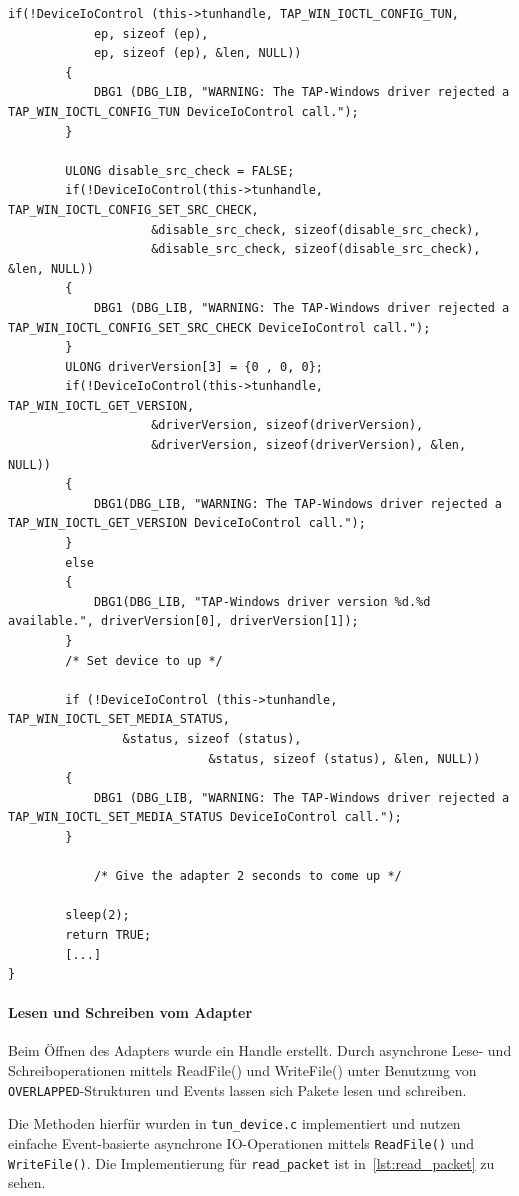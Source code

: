 {\begin{lstlisting}[caption=Konfiguration eines TAP-Geräts,label=lst:tap-device-configuration]
        if(!DeviceIoControl (this->tunhandle, TAP_WIN_IOCTL_CONFIG_TUN,
            ep, sizeof (ep),
            ep, sizeof (ep), &len, NULL))
        {
            DBG1 (DBG_LIB, "WARNING: The TAP-Windows driver rejected a TAP_WIN_IOCTL_CONFIG_TUN DeviceIoControl call.");
        }

        ULONG disable_src_check = FALSE;
        if(!DeviceIoControl(this->tunhandle, TAP_WIN_IOCTL_CONFIG_SET_SRC_CHECK,
                    &disable_src_check, sizeof(disable_src_check),
                    &disable_src_check, sizeof(disable_src_check), &len, NULL))
        {
            DBG1 (DBG_LIB, "WARNING: The TAP-Windows driver rejected a TAP_WIN_IOCTL_CONFIG_SET_SRC_CHECK DeviceIoControl call.");
        }
        ULONG driverVersion[3] = {0 , 0, 0};
        if(!DeviceIoControl(this->tunhandle, TAP_WIN_IOCTL_GET_VERSION,
                    &driverVersion, sizeof(driverVersion),
                    &driverVersion, sizeof(driverVersion), &len, NULL))
        {
            DBG1(DBG_LIB, "WARNING: The TAP-Windows driver rejected a TAP_WIN_IOCTL_GET_VERSION DeviceIoControl call.");
        }
        else
        {
            DBG1(DBG_LIB, "TAP-Windows driver version %d.%d available.", driverVersion[0], driverVersion[1]);
        }
        /* Set device to up */

        if (!DeviceIoControl (this->tunhandle, TAP_WIN_IOCTL_SET_MEDIA_STATUS,
                &status, sizeof (status),
                            &status, sizeof (status), &len, NULL))
        {
            DBG1 (DBG_LIB, "WARNING: The TAP-Windows driver rejected a TAP_WIN_IOCTL_SET_MEDIA_STATUS DeviceIoControl call.");
        }

            /* Give the adapter 2 seconds to come up */

        sleep(2);
        return TRUE;
        [...]
}
\end{lstlisting}


\paragraph{Lesen und Schreiben vom Adapter}
Beim Öffnen des Adapters wurde ein Handle erstellt.
Durch asynchrone Lese- und Schreiboperationen mittels ReadFile() und WriteFile()
unter Benutzung von \texttt{OVERLAPPED}-Strukturen und Events lassen sich Pakete
lesen und schreiben.

Die Methoden hierfür wurden in \texttt{tun\_device.c} implementiert
und nutzen einfache Event-basierte asynchrone IO-Operationen mittels \texttt{ReadFile()}
und \texttt{WriteFile()}.
Die Implementierung für \texttt{read\_packet} ist in~\autoref{lst:read_packet} zu sehen.

}
